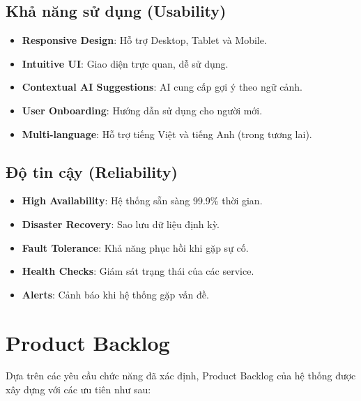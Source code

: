 \documentclass[12pt,a4paper]{report}
\begin{document}
\subsection{Khả năng sử dụng (Usability)}

\begin{itemize}
\item \textbf{Responsive Design}: Hỗ trợ Desktop, Tablet và Mobile.
\item \textbf{Intuitive UI}: Giao diện trực quan, dễ sử dụng.
\item \textbf{Contextual AI Suggestions}: AI cung cấp gợi ý theo ngữ cảnh.
\item \textbf{User Onboarding}: Hướng dẫn sử dụng cho người mới.
\item \textbf{Multi-language}: Hỗ trợ tiếng Việt và tiếng Anh (trong tương lai).
\end{itemize}

\subsection{Độ tin cậy (Reliability)}

\begin{itemize}
\item \textbf{High Availability}: Hệ thống sẵn sàng 99.9\% thời gian.
\item \textbf{Disaster Recovery}: Sao lưu dữ liệu định kỳ.
\item \textbf{Fault Tolerance}: Khả năng phục hồi khi gặp sự cố.
\item \textbf{Health Checks}: Giám sát trạng thái của các service.
\item \textbf{Alerts}: Cảnh báo khi hệ thống gặp vấn đề.
\end{itemize}

\section{Product Backlog}

Dựa trên các yêu cầu chức năng đã xác định, Product Backlog của hệ thống được xây dựng với các ưu tiên như sau:
\end{document}
